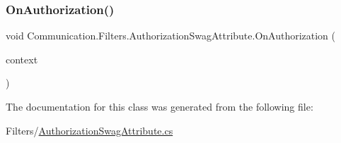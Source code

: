 \subsubsection{\texorpdfstring{On\+Authorization()}{OnAuthorization()}}
{\footnotesize\ttfamily void Communication.\+Filters.\+Authorization\+Swag\+Attribute.\+On\+Authorization (\begin{DoxyParamCaption}\item[{Authorization\+Filter\+Context}]{context }\end{DoxyParamCaption})}



The documentation for this class was generated from the following file\+:\begin{DoxyCompactItemize}
\item 
Filters/\mbox{\hyperlink{_authorization_swag_attribute_8cs}{Authorization\+Swag\+Attribute.\+cs}}\end{DoxyCompactItemize}
